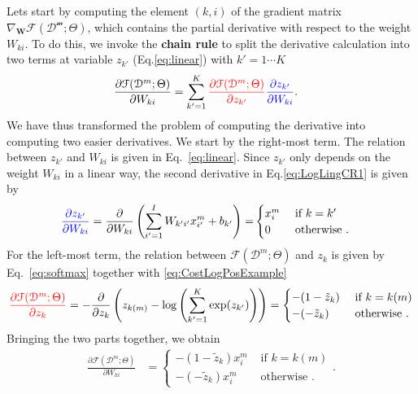 Lets start by computing the element $(k,i)$ of the gradient matrix
$\nabla_\mathbf{W}\mathcal{F}(\mathcal{D^m};\Theta)$, which contains the partial
derivative with respect to the weight $W_{ki}$. To do this, we invoke the
\textbf{chain rule} to split the derivative calculation into two terms at
variable $z_{k'}$ (Eq.\ref{eq:linear}) with $k'=1\cdots K$
%
\begin{align}
\frac{\partial \mathcal{F}(\mathcal{D}^m;\Theta)}{\partial W_{ki}} & = \sum_{k'=1}^{K} { \color{red} \frac{\partial \mathcal{F}(\mathcal{D}^m;\Theta)}{\partial z_{k'}} }{ \color{blue} \frac{\partial z_{k'}}{\partial W_{ki}}}.
\label{eq:LogLingCR1}
\end{align}
%
We have thus transformed the problem of computing the derivative into computing
two easier derivatives. We start by the right-most term. The relation between
$z_{k'}$ and $W_{ki}$ is given in Eq.~\ref{eq:linear}. Since $z_{k'}$ only
depends on the weight $W_{ki}$ in a linear way, the second derivative in
Eq.\ref{eq:LogLingCR1} is given by
\begin{align}
{ \color{blue} \frac{\partial z_{k'}}{\partial W_{ki}}} = \frac{\partial }{\partial W_{ki}}\left(\sum_{i'=1}^{I} W_{k'i'} x^m_{i'} + b_{k'} \right) =
  &\begin{cases}
      x_i^m  &  \mbox{ if } k = k'\\
      0    &  \mbox{ otherwise }.
  \end{cases}
  \label{eq:partialLinear}
\end{align}
%
\noindent For the left-most term, the relation between $\mathcal{F}(\mathcal{D}^m;\Theta)$ and $z_k$ is given by Eq.~\ref{eq:softmax} together with \ref{eq:CostLogPosExample}
%
\begin{align}
{ \color{red} \frac{\partial \mathcal{F}(\mathcal{D}^m;\Theta)}{\partial z_{k}} }= - \frac{\partial }{\partial z_{k}}\left(z_{k(m)} - \log\left(\sum_{k'=1}^{K} \exp(z_{k'}) \right) \right) =
  \begin{cases}
      -(1 - \tilde{z}_k)  &  \mbox{ if } k = k(m)\\
      -(-\tilde{z}_k)     &  \mbox{ otherwise }.
  \end{cases}
  \label{eq:patialSoftmax}
\end{align}
%
Bringing the two parts together, we obtain
%
\begin{align}
\frac{\partial \mathcal{F}(\mathcal{D}^m;\Theta)}{\partial W_{ki}} & =
  \begin{cases}
      -(1 - \tilde{z}_k) x_i^m  &  \mbox{ if } k = k(m)\\
      -(-\tilde{z}_k) x_i^m     &  \mbox{ otherwise }.
  \end{cases}.
\label{eq:LogLingCR2}
\end{align}
%

